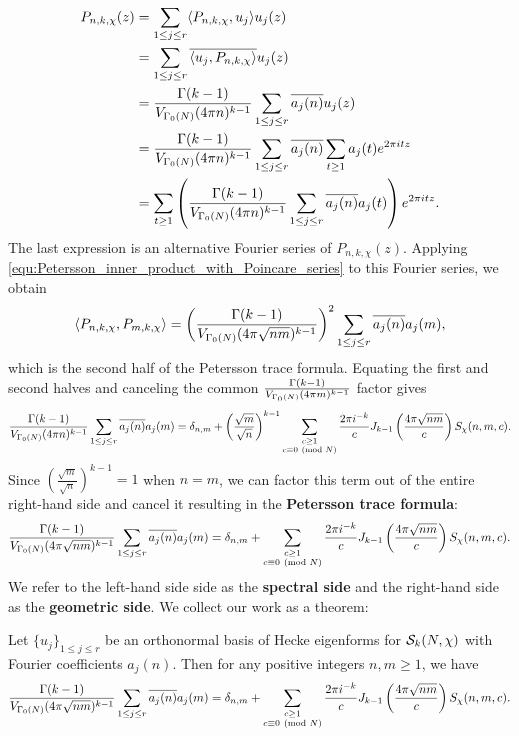     \begin{align*}
      P_{n,k,\chi}(z) &= \sum_{1 \le j \le r}\langle P_{n,k,\chi},u_{j}\rangle u_{j}(z) \\
      &= \sum_{1 \le j \le r}\overline{\langle u_{j},P_{n,k,\chi}\rangle}u_{j}(z) \\
      &= \frac{\Gamma(k-1)}{V_{\Gamma_{0}(N)}(4\pi n)^{k-1}}\sum_{1 \le j \le r}\overline{a_{j}(n)}u_{j}(z) \\
      &= \frac{\Gamma(k-1)}{V_{\Gamma_{0}(N)}(4\pi n)^{k-1}}\sum_{1 \le j \le r}\overline{a_{j}(n)}\sum_{t \ge 1}a_{j}(t)e^{2\pi itz} \\
      &= \sum_{t \ge 1}\left(\frac{\Gamma(k-1)}{V_{\Gamma_{0}(N)}(4\pi n)^{k-1}}\sum_{1 \le j \le r}\overline{a_{j}(n)}a_{j}(t)\right)e^{2\pi itz}.
    \end{align*}
    The last expression is an alternative Fourier series of $P_{n,k,\chi}(z)$. Applying \cref{equ:Petersson_inner_product_with_Poincare_series} to this Fourier series, we obtain
    \[
      \langle P_{n,k,\chi},P_{m,k,\chi}\rangle = \left(\frac{\Gamma(k-1)}{V_{\Gamma_{0}(N)}(4\pi \sqrt{nm})^{k-1}}\right)^{2}\sum_{1 \le j \le r}\overline{a_{j}(n)}a_{j}(m),
    \]
    which is the second half of the Petersson trace formula. Equating the first and second halves and canceling the common $\frac{\Gamma(k-1)}{V_{\Gamma_{0}(N)}(4\pi m)^{k-1}}$ factor gives
    \[
      \frac{\Gamma(k-1)}{V_{\Gamma_{0}(N)}(4\pi n)^{k-1}}\sum_{1 \le j \le r}\overline{a_{j}(n)}a_{j}(m) = \delta_{n,m}+\left(\frac{\sqrt{m}}{\sqrt{n}}\right)^{k-1}\sum_{\substack{c \ge 1 \\ c \equiv 0 \ \left(\text{mod }N\right)}}\frac{2\pi i^{-k}}{c}J_{k-1}\left(\frac{4\pi\sqrt{nm}}{c}\right)S_{\chi}(n,m,c).
    \]
    Since $\left(\frac{\sqrt{m}}{\sqrt{n}}\right)^{k-1} = 1$ when $n = m$, we can factor this term out of the entire right-hand side and cancel it resulting in the \textbf{Petersson trace formula}:
    \[
      \frac{\Gamma(k-1)}{V_{\Gamma_{0}(N)}(4\pi\sqrt{nm})^{k-1}}\sum_{1 \le j \le r}\overline{a_{j}(n)}a_{j}(m) = \delta_{n,m}+\sum_{\substack{c \ge 1 \\ c \equiv 0 \ \left(\text{mod }N\right)}}\frac{2\pi i^{-k}}{c}J_{k-1}\left(\frac{4\pi\sqrt{nm}}{c}\right)S_{\chi}(n,m,c).
    \]
    We refer to the left-hand side side as the \textbf{spectral side} and the right-hand side as the \textbf{geometric side}. We collect our work as a theorem:

    \begin{theorem}
      Let $\{u_{j}\}_{1 \le j \le r}$ be an orthonormal basis of Hecke eigenforms for $\mathcal{S}_{k}(N,\chi)$ with Fourier coefficients $a_{j}(n)$. Then for any positive integers $n,m \ge 1$, we have
      \[
        \frac{\Gamma(k-1)}{V_{\Gamma_{0}(N)}(4\pi\sqrt{nm})^{k-1}}\sum_{1 \le j \le r}\overline{a_{j}(n)}a_{j}(m) = \delta_{n,m}+\sum_{\substack{c \ge 1 \\ c \equiv 0 \ \left(\text{mod }N\right)}}\frac{2\pi i^{-k}}{c}J_{k-1}\left(\frac{4\pi\sqrt{nm}}{c}\right)S_{\chi}(n,m,c).
      \]
    \end{theorem}
